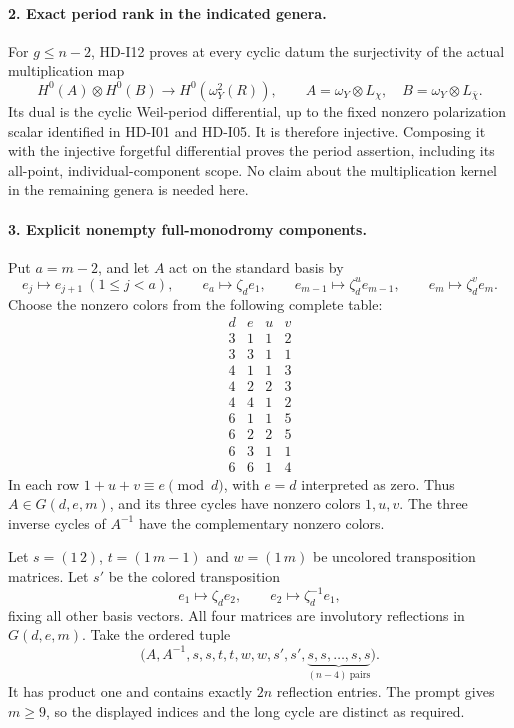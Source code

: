 \paragraph{2. Exact period rank in the indicated genera.}
For $g\leq n-2$, HD-I12 proves at every cyclic datum the
surjectivity of the actual multiplication map
\[
 H^0(A)\otimes H^0(B)
       \longrightarrow H^0(\omega_Y^2(R)),\qquad
 A=\omega_Y\otimes L_\chi,
 \quad B=\omega_Y\otimes L_{\bar\chi}.
\]
Its dual is the cyclic Weil-period differential, up to the
fixed nonzero polarization scalar identified in HD-I01 and
HD-I05. It is therefore injective. Composing it with the
injective forgetful differential proves the period assertion,
including its all-point, individual-component scope. No claim
about the multiplication kernel in the remaining genera is
needed here.

\paragraph{3. Explicit nonempty full-monodromy components.}
Put $a=m-2$, and let $A$ act on the standard basis by
\[
 e_j\longmapsto e_{j+1}\ (1\leq j<a),\qquad
 e_a\longmapsto\zeta_d e_1,\qquad
 e_{m-1}\longmapsto\zeta_d^u e_{m-1},\qquad
 e_m\longmapsto\zeta_d^v e_m.
\]
Choose the nonzero colors from the following complete table:
\[
\begin{array}{c|c|c|c}
 d&e&u&v\\\hline
 3&1&1&2\\
 3&3&1&1\\
 4&1&1&3\\
 4&2&2&3\\
 4&4&1&2\\
 6&1&1&5\\
 6&2&2&5\\
 6&3&1&1\\
 6&6&1&4
\end{array}
\]
In each row $1+u+v\equiv e\pmod d$, with $e=d$
interpreted as zero. Thus $A\in G(d,e,m)$, and its three
cycles have nonzero colors $1,u,v$. The three inverse cycles
of $A^{-1}$ have the complementary nonzero colors.

Let $s=(1\,2)$, $t=(1\,m-1)$ and $w=(1\,m)$ be
uncolored transposition matrices. Let $s'$ be the colored
transposition
\[
 e_1\longmapsto\zeta_d e_2,\qquad
 e_2\longmapsto\zeta_d^{-1}e_1,
\]
fixing all other basis vectors. All four matrices are involutory
reflections in $G(d,e,m)$. Take the ordered tuple
\begin{equation}
 \bigl(A,A^{-1},s,s,t,t,w,w,s',s',
                 \underbrace{s,s,\ldots,s,s}_{(n-4)\ \text{pairs}}\bigr).
                                                        \tag{I18.5}
\end{equation}
It has product one and contains exactly $2n$ reflection entries.
The prompt gives $m\geq9$, so the displayed indices and the
long cycle are distinct as required.

